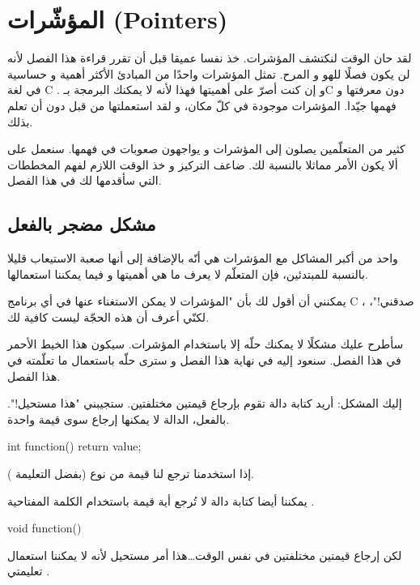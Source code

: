 \chapter{المؤشّرات (\textenglish{Pointers})}

لقد حان الوقت لنكتشف المؤشرات. خذ نفسا عميقا قبل أن تقرر قراءة هذا الفصل لأنه لن يكون فصلًا للهو و المرح. تمثل المؤشرات واحدًا من المبادئ الأكثر أهمية و حساسية في لغة \textenglish{C}
. و إن كنت أصرّ على أهميتها فهذا  لأنه لا يمكنك البرمجة بـ\textenglish{C}
دون معرفتها و فهمها جيّدا. المؤشرات موجودة في كلّ مكان، و لقد استعملتها من قبل دون أن تعلم بذلك.

كثير من المتعلّمين يصلون إلى المؤشرات و يواجهون صعوبات في فهمها. سنعمل على ألا يكون الأمر مماثلا بالنسبة لك. ضاعف التركيز و خذ الوقت اللازم لفهم المخططات التي سأقدمها لك في هذا الفصل.

\section{مشكل مضجر بالفعل}

واحد من أكبر المشاكل مع المؤشرات هي أنّه بالإضافة إلى أنها صعبة الاستيعاب قليلا بالنسبة للمبتدئين، فإن المتعلّم لا يعرف ما هي أهميتها و فيما يمكننا استعمالها.

يمكنني أن أقول لك بأن "المؤشرات لا يمكن الاستغناء عنها في أي برنامج
\textenglish{C}
، صدقني!"، لكنّي أعرف أن هذه الحجّة ليست كافية لك.

سأطرح عليك مشكلًا لا يمكنك حلّه إلا باستخدام المؤشرات. سيكون هذا الخيط الأحمر في هذا الفصل. سنعود إليه في نهاية هذا الفصل و سترى حلّه باستعمال ما تعلّمته في هذا الفصل.

إليك المشكل: أريد كتابة دالة تقوم بإرجاع قيمتين مختلفتين. ستجيبني "هذا مستحيل!". بالفعل، الدالة لا يمكنها إرجاع سوى قيمة واحدة.

\begin{Csource}
int function()
{
	return value;
}
\end{Csource}

إذا استخدمنا
ترجع لنا قيمة من نوع
(بفضل التعليمة
).

يمكننا أيضا كتابة دالة لا تُرجع أية قيمة باستخدام الكلمة المفتاحية
.

\begin{Csource}
void function()
{

}
\end{Csource}

لكن إرجاع قيمتين مختلفتين في نفس الوقت\dots هذا أمر مستحيل لأنه لا يمكننا استعمال تعليمتي
.

